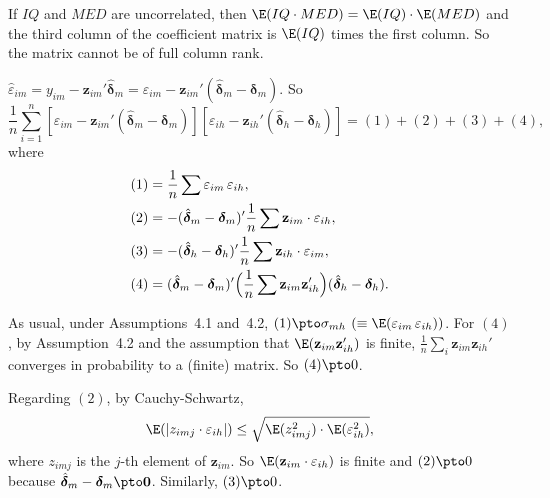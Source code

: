 \begin{answers}
If $IQ$ and $MED$ are uncorrelated, then
$\E(IQ \cdot MED) = \E(IQ) \cdot \E(MED)$ and the third column of the coefficient
matrix is $\E(IQ)$ times the first column. So the matrix cannot be of full column rank.

$\hat{\varepsilon}_{im} = y_{im} - \mathbf{z}_{im}' \hat{\boldsymbol{\delta}}_m
= \varepsilon_{im} - \mathbf{z}_{im}'(\hat{\boldsymbol{\delta}}_m - \boldsymbol{\delta}_m)$.
So
\[
\frac{1}{n} \sum_{i=1}^{n}
[\varepsilon_{im} - \mathbf{z}_{im}'(\hat{\boldsymbol{\delta}}_m - \boldsymbol{\delta}_m)]
[\varepsilon_{ih} - \mathbf{z}_{ih}'(\hat{\boldsymbol{\delta}}_h - \boldsymbol{\delta}_h)]
= (1) + (2) + (3) + (4),
\]
where
\begin{align*}
(1) &= \frac{1}{n} \sum \varepsilon_{im}\, \varepsilon_{ih}, \\
(2) &= -(\hat{\boldsymbol{\delta}}_m - \boldsymbol{\delta}_m)'
\frac{1}{n} \sum \mathbf{z}_{im} \cdot \varepsilon_{ih}, \\
(3) &= -(\hat{\boldsymbol{\delta}}_h - \boldsymbol{\delta}_h)'
\frac{1}{n} \sum \mathbf{z}_{ih} \cdot \varepsilon_{im}, \\
(4) &= (\hat{\boldsymbol{\delta}}_m - \boldsymbol{\delta}_m)'
\Bigl(\frac{1}{n} \sum \mathbf{z}_{im} \mathbf{z}_{ih}'\Bigr)
(\hat{\boldsymbol{\delta}}_h - \boldsymbol{\delta}_h).
\end{align*}

As usual, under Assumptions~4.1 and~4.2,
$(1) \pto \sigma_{mh}$ $(\equiv \E(\varepsilon_{im}\, \varepsilon_{ih}))$.
For $(4)$, by Assumption~4.2 and the assumption that
$\E(\mathbf{z}_{im} \mathbf{z}_{ih}')$ is finite,
$\frac{1}{n} \sum_i \mathbf{z}_{im} \mathbf{z}_{ih}'$ converges in probability to
a (finite) matrix. So $(4) \pto 0$.

Regarding $(2)$, by Cauchy-Schwartz,
\[
\E(|z_{imj} \cdot \varepsilon_{ih}|) \leq \sqrt{\E(z_{imj}^2) \cdot \E(\varepsilon_{ih}^2)},
\]
where $z_{imj}$ is the $j$-th element of $\mathbf{z}_{im}$.
So $\E(\mathbf{z}_{im} \cdot \varepsilon_{ih})$ is finite and
$(2) \pto 0$ because $\hat{\boldsymbol{\delta}}_m - \boldsymbol{\delta}_m \pto \mathbf{0}$.
Similarly, $(3) \pto 0$.
\end{answers}
